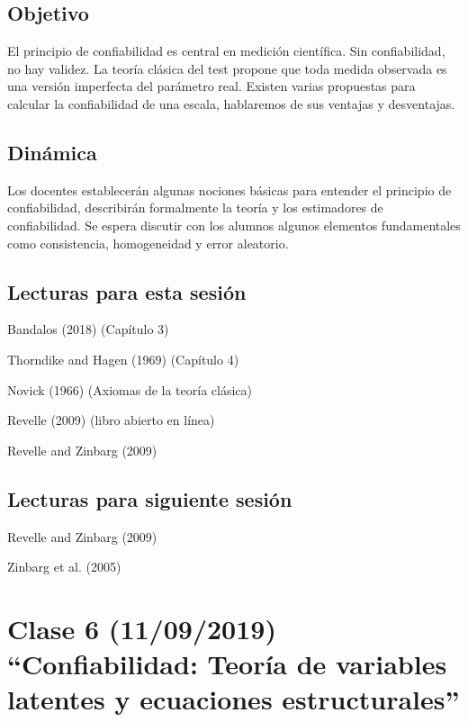 \documentclass[11pt,]{article}
\begin{document}
\hypertarget{objetivo-4}{%
\subsection{Objetivo}\label{objetivo-4}}

El principio de confiabilidad es central en medición científica. Sin
confiabilidad, no hay validez. La teoría clásica del test propone que
toda medida observada es una versión imperfecta del parámetro real.
Existen varias propuestas para calcular la confiabilidad de una escala,
hablaremos de sus ventajas y desventajas.

\hypertarget{dinamica-4}{%
\subsection{Dinámica}\label{dinamica-4}}

Los docentes establecerán algunas nociones básicas para entender el
principio de confiabilidad, describirán formalmente la teoría y los
estimadores de confiabilidad. Se espera discutir con los alumnos algunos
elementos fundamentales como consistencia, homogeneidad y error
aleatorio.

\hypertarget{lecturas-para-esta-sesion-3}{%
\subsection{Lecturas para esta
sesión}\label{lecturas-para-esta-sesion-3}}

Bandalos (2018) (Capítulo 3)

Thorndike and Hagen (1969) (Capítulo 4)

Novick (1966) (Axiomas de la teoría clásica)

Revelle (2009) (libro abierto en línea)

Revelle and Zinbarg (2009)

\hypertarget{lecturas-para-siguiente-sesion-3}{%
\subsection{Lecturas para siguiente
sesión}\label{lecturas-para-siguiente-sesion-3}}

Revelle and Zinbarg (2009)

Zinbarg et al. (2005)

\hypertarget{clase-6-11092019-confiabilidad-teoria-de-variables-latentes-y-ecuaciones-estructurales}{%
\section{Clase 6 (11/09/2019) ``Confiabilidad: Teoría de variables
latentes y ecuaciones
estructurales''}\label{clase-6-11092019-confiabilidad-teoria-de-variables-latentes-y-ecuaciones-estructurales}}
\end{document}
